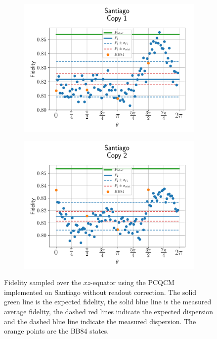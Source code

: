   
  \begin{figure}[H]
    \centering
    \begin{subfigure}{.5\textwidth}
      \centering
      \includegraphics[width=\textwidth]{Figures/PhaseCovariant/IBM/OnlyEquator/results_santiago_copy1.png}
      \label{fig:pc_uncorrected_santiago_equator_1}
    \end{subfigure}%
    \begin{subfigure}{.5\textwidth}
      \centering
      \includegraphics[width=\textwidth]{Figures/PhaseCovariant/IBM/OnlyEquator/results_santiago_copy2.png}
      \label{fig:pc_uncorrected_santiago_equator_2}
    \end{subfigure}
    \vspace{-0.5cm}
    \caption{Fidelity sampled over the $xz$-equator using the PCQCM implemented on Santiago without readout correction. The solid green line is the expected fidelity, the solid blue line is the measured average fidelity, the dashed red lines indicate the expected dispersion and the dashed blue line indicate the measured dispersion. The orange points are the BB84 states.}
    \label{fig:pc_uncorrected_santiago_equator}
  \end{figure}
  
